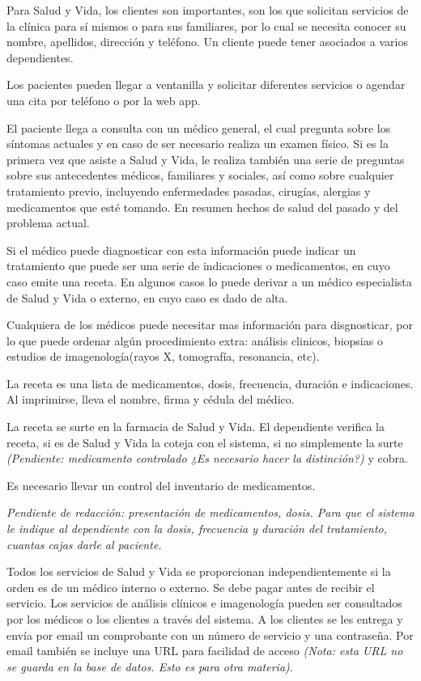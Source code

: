 \documentclass[
  letterpaper,
  DIV=11,
  numbers=noendperiod]{scrreprt}
\begin{document}
Para Salud y Vida, los clientes son importantes, son los que solicitan
servicios de la clínica para sí mismos o para sus familiares, por lo
cual se necesita conocer su nombre, apellidos, dirección y teléfono. Un
cliente puede tener asociados a varios dependientes.

Los pacientes pueden llegar a ventanilla y solicitar diferentes
servicios o agendar una cita por teléfono o por la web app.

El paciente llega a consulta con un médico general, el cual pregunta
sobre los síntomas actuales y en caso de ser necesario realiza un examen
físico. Si es la primera vez que asiste a Salud y Vida, le realiza
también una serie de preguntas sobre sus antecedentes médicos,
familiares y sociales, así como sobre cualquier tratamiento previo,
incluyendo enfermedades pasadas, cirugías, alergias y medicamentos que
esté tomando. En resumen hechos de salud del pasado y del problema
actual.

Si el médico puede diagnosticar con esta información puede indicar un
tratamiento que puede ser una serie de indicaciones o medicamentos, en
cuyo caso emite una receta. En algunos casos lo puede derivar a un
médico especialista de Salud y Vida o externo, en cuyo caso es dado de
alta.

Cualquiera de los médicos puede necesitar mas información para
disgnosticar, por lo que puede ordenar algún procedimiento extra:
análisis clinicos, biopsias o estudios de imagenología(rayos X,
tomografía, resonancia, etc).

La receta es una lista de medicamentos, dosis, frecuencia, duración e
indicaciones. Al imprimirse, lleva el nombre, firma y cédula del médico.

La receta se surte en la farmacia de Salud y Vida. El dependiente
verifica la receta, si es de Salud y Vida la coteja con el sistema, si
no simplemente la surte \emph{(Pendiente: medicamento controlado ¿Es
necesario hacer la distinción?)} y cobra.

Es necesario llevar un control del inventario de medicamentos.

\emph{Pendiente de redacción: presentación de medicamentos, dosis. Para
que el sistema le indique al dependiente con la dosis, frecuencia y
duración del tratamiento, cuantas cajas darle al paciente.}

Todos los servicios de Salud y Vida se proporcionan independientemente
si la orden es de un médico interno o externo. Se debe pagar antes de
recibir el servicio. Los servicios de análisis clínicos e imagenología
pueden ser consultados por los médicos o los clientes a través del
sistema. A los clientes se les entrega y envía por email un comprobante
con un número de servicio y una contraseña. Por email también se incluye
una URL para facilidad de acceso \emph{(Nota: esta URL no se guarda en
la base de datos. Esto es para otra materia)}.
\end{document}
